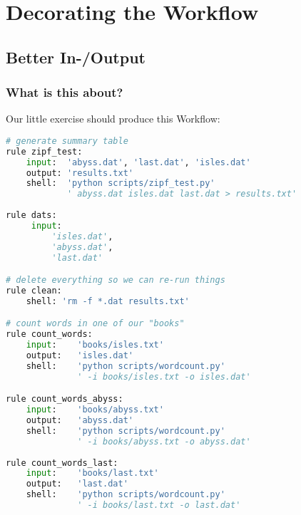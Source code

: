 \section{Decorating the Workflow}

\subsection{Better In-/Output}

\begin{frame}
  \frametitle{What is this about?}
\end{frame}


\begin{frame}[fragile]
Our little exercise should produce this Workflow:
     \begin{lstlisting}[language=Python,style=Python, basicstyle=\tiny]
# generate summary table
rule zipf_test:
    input:  'abyss.dat', 'last.dat', 'isles.dat'
    output: 'results.txt'
    shell:  'python scripts/zipf_test.py' 
            ' abyss.dat isles.dat last.dat > results.txt'
    
rule dats:
     input:
         'isles.dat',
         'abyss.dat',
         'last.dat'

# delete everything so we can re-run things
rule clean:
    shell: 'rm -f *.dat results.txt'

# count words in one of our "books"
rule count_words:
    input:    'books/isles.txt'
    output:   'isles.dat'
    shell:    'python scripts/wordcount.py'
              ' -i books/isles.txt -o isles.dat'

rule count_words_abyss:
    input:    'books/abyss.txt'
    output:   'abyss.dat'
    shell:    'python scripts/wordcount.py' 
              ' -i books/abyss.txt -o abyss.dat'
              
rule count_words_last:
    input:    'books/last.txt'
    output:   'last.dat'
    shell:    'python scripts/wordcount.py'
              ' -i books/last.txt -o last.dat'
\end{lstlisting}
\end{frame}

